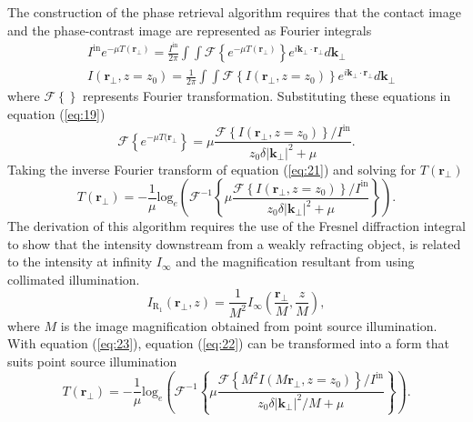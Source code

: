 \documentclass[10pt, a4paper, singlespacing]{report}
\begin{document}
The construction of the phase retrieval algorithm requires that the contact image and the phase-contrast image are represented as Fourier integrals\cite{Pags2002}
\begin{align}\label{eq:20}
&I^{\mathrm{in}} e^{-\mu T(\mathbf{r}_{\perp})} = \frac{I^{\mathrm{in}}}{2 \pi} \int \int \mathscr{F} \left \{ e^{-\mu T(\mathbf{r}_{\perp})} \right \} e^{i \mathbf{k}_{\perp}\cdot \mathbf{r}_{\perp}} d \mathbf{k}_{\perp}
\\&I(\mathbf{r}_{\perp}, z=z_0) = \frac{1}{2 \pi}  \int \int \mathscr{F} \left \{ I (\mathbf{r}_{\perp}, z = z_0) \right \} e^{i \mathbf{k}_{\perp}\cdot \mathbf{r}_{\perp}} d \mathbf{k}_{\perp}
\end{align}
where $\mathscr{F}\left \{ \right \}$ represents Fourier transformation. Substituting these equations in equation (\ref{eq:19})
\begin{equation}\label{eq:21}
\mathscr{F}\left \{ e^{-\mu T(\mathbf{r}_{\perp}} \right \} = \mu \frac{\mathscr{F}\left \{ I(\mathbf{r}_{\perp}, z=z_0)\right \}/I^{\mathrm{in}}}{z_0 \delta |\mathbf{k}_{\perp}|^{2} + \mu}.
\end{equation}
Taking the inverse Fourier transform of equation (\ref{eq:21}) and solving for $T(\mathbf{r}_{\perp})$
\begin{equation}\label{eq:22}
T(\mathbf{r}_{\perp}) = - \frac{1}{\mu} \mathrm{log}_{e} \left ( \mathscr{F}^{-1} \left \{ \mu \frac{ \mathscr{F} \left \{I(\mathbf{r}_{\perp}, z=z_0) \right \} /  I^{\mathrm{in}}}{z_0 \delta |\mathbf{k}_{\perp}|^{2} + \mu}  \right \} \right ).
\end{equation}
The derivation of this algorithm requires the use of the Fresnel diffraction integral to show that the intensity downstream from a weakly refracting object, is related to the intensity at infinity $I_{\infty}$ and the magnification resultant from using collimated illumination\cite{Pags2002}.
\begin{equation}\label{eq:23}
I_{\mathrm{R_{1}}}(\mathbf{r_{\perp}}, z) = \frac{1}{M^2} I_{\infty} \left ( \frac{\mathbf{r_\perp}}{M}, \frac{z}{M} \right ),
\end{equation}
where $M$ is the image magnification obtained from point source illumination. With equation (\ref{eq:23}), equation (\ref{eq:22}) can be transformed into a form that suits point source illumination\cite{Pags2002}
\begin{equation}\label{eq:24}
T(\mathbf{r}_{\perp}) = - \frac{1}{\mu} \mathrm{log}_{e} \left ( \mathscr{F}^{-1} \left \{ \mu \frac{ \mathscr{F} \left \{M^2 I(M\mathbf{r}_{\perp}, z=z_0) \right \} /  I^{\mathrm{in}}}{z_0 \delta |\mathbf{k}_{\perp}|^{2}/M + \mu}  \right \} \right ).
\end{equation}
\end{document}
